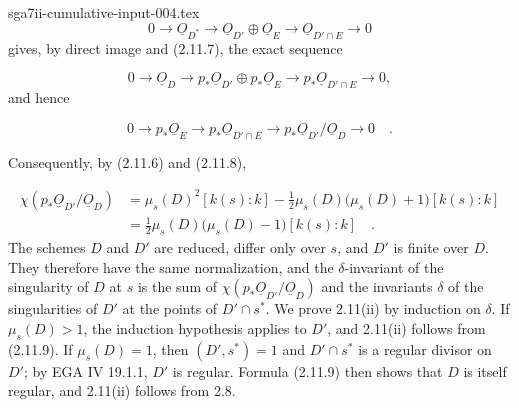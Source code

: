 \begin{filecontents*}{sga7ii-cumulative-input-004.tex}
\begin{equation*}
0\longrightarrow\underline{O}_{D^*}
\longrightarrow\underline{O}_{D'}\oplus\underline{O}_E
\longrightarrow\underline{O}_{D'\cap E}
\longrightarrow0
\end{equation*}
gives, by direct image and (2.11.7), the exact sequence

\begin{equation*}
0\longrightarrow\underline{O}_D
\longrightarrow p_*\underline{O}_{D'}\oplus p_*\underline{O}_E
\longrightarrow p_*\underline{O}_{D'\cap E}
\longrightarrow0,
\end{equation*}
and hence

\begin{equation*}
0\longrightarrow p_*\underline{O}_E
\longrightarrow p_*\underline{O}_{D'\cap E}
\longrightarrow p_*\underline{O}_{D'}/\underline{O}_D
\longrightarrow0 \quad .
\end{equation*}


Consequently, by (2.11.6) and (2.11.8),

\begin{equation}\tag{2.11.9}
\begin{aligned}
\chi(p_*\underline{O}_{D'}/\underline{O}_D)
&=\mu_s(D)^2[k(s):k]
-\frac12\mu_s(D)\bigl(\mu_s(D)+1\bigr)[k(s):k]\\
&=\frac12\mu_s(D)\bigl(\mu_s(D)-1\bigr)[k(s):k] \quad .
\end{aligned}
\end{equation}
The schemes $D$ and $D'$ are reduced, differ only over $s$, and $D'$ is finite
over $D$.  They therefore have the same normalization, and the $\delta$-invariant
of the singularity of $D$ at $s$ is the sum of
$\chi(p_*\underline{O}_{D'}/\underline{O}_D)$ and the invariants $\delta$ of the
singularities of $D'$ at the points of $D'\cap s^*$.  We prove 2.11(ii) by
induction on $\delta$.  If $\mu_s(D)>1$, the induction hypothesis applies to
$D'$, and 2.11(ii) follows from (2.11.9).  If $\mu_s(D)=1$, then
$(D',s^*)=1$ and $D'\cap s^*$ is a regular divisor on $D'$; by EGA IV 19.1.1,
$D'$ is regular.  Formula (2.11.9) then shows that $D$ is itself regular, and
2.11(ii) follows from 2.8.

\end{filecontents*}
